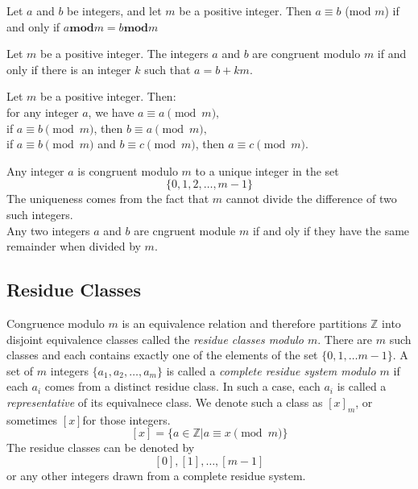 \begin{theorem}
Let $a$ and $b$ be integers, and let $m$ be a positive integer. Then $a   \equiv b$ (mod $m$) if and only if $a   \mathbf{mod} m = b   \mathbf{mod} m$ 
\end{theorem}

\begin{theorem}
Let $m$ be a positive integer. The integers $a$ and $b$ are congruent modulo $m$ if and only if there is an integer $k$ such that $a=b+km$.
\end{theorem}

\begin{theorem}
Let $m$ be a positive integer. Then: \\
for any integer $a$, we have $a\equiv a \pmod{m},$\\
if $a\equiv b\pmod{m}$, then $b \equiv a\pmod{m},$ \\
if $a\equiv b\pmod{m}$ and $b\equiv c\pmod{m}$, then $a\equiv c\pmod{m}$.
\end{theorem}

\begin{notes}
Any integer $a$ is congruent modulo $m$ to a unique integer in the set \\
$$\{0,1,2,\dots ,m-1\}$$
The uniqueness comes from the fact that $m$ cannot divide the difference of two such integers.\\
Any two integers $a$ and $b$ are cngruent module $m$ if and oly if they have the same remainder when divided by $m$.
\end{notes}

\subsection {Residue Classes} 
Congruence modulo $m$ is an equivalence relation and therefore partitions $\mathbb{Z}$ into disjoint equivalence classes called the \textit{residue classes modulo $m$}. There are $m$ such classes and each contains exactly one of the elements of the set $\{0,1,\dots m-1\}$. A set of $m$ integers $\{a_1,a_2,\dots ,a_m\}$ is called a \textit{complete residue system modulo $m$} if each $a_i$ comes from a distinct residue class. In such a case, each $a_i$ is called a \textit{representative} of its equivalnece class. We denote such a class as $[x]_m$, or sometimes $[x]$for those integers.
$$[x] = \{a\in \mathbb{Z} \vert a \equiv x \pmod{m}\}$$
The residue classes can be denoted by 
$$[0],[1],\dots ,[m-1]$$
or any other integers drawn from a complete residue system.

